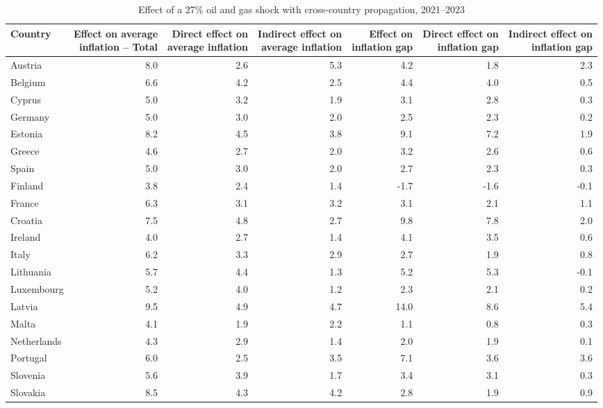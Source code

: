 \begin{table}[H]
\centering
\caption{Effect of a 27\% oil and gas shock with cross-country propagation, 2021--2023}
\label{tab:shock-oil-gas-chain-ea20}
\scriptsize
\setlength{\tabcolsep}{1.2pt}
\begin{tabular}{lrrrrrr}
\toprule
Country & \shortstack{Effect on average\\inflation -- Total} & \shortstack{Direct effect on\\average inflation} & \shortstack{Indirect effect on\\average inflation} & \shortstack{Effect on\\inflation gap} & \shortstack{Direct effect on\\inflation gap} & \shortstack{Indirect effect on\\inflation gap}
 \\
\midrule
Austria & 8.0 & 2.6 & 5.3 & 4.2 & 1.8 & 2.3
 \\
Belgium & 6.6 & 4.2 & 2.5 & 4.4 & 4.0 & 0.5
 \\
Cyprus & 5.0 & 3.2 & 1.9 & 3.1 & 2.8 & 0.3
 \\
Germany & 5.0 & 3.0 & 2.0 & 2.5 & 2.3 & 0.2
 \\
Estonia & 8.2 & 4.5 & 3.8 & 9.1 & 7.2 & 1.9
 \\
Greece & 4.6 & 2.7 & 2.0 & 3.2 & 2.6 & 0.6
 \\
Spain & 5.0 & 3.0 & 2.0 & 2.7 & 2.3 & 0.3
 \\
Finland & 3.8 & 2.4 & 1.4 & -1.7 & -1.6 & -0.1
 \\
France & 6.3 & 3.1 & 3.2 & 3.1 & 2.1 & 1.1
 \\
Croatia & 7.5 & 4.8 & 2.7 & 9.8 & 7.8 & 2.0
 \\
Ireland & 4.0 & 2.7 & 1.4 & 4.1 & 3.5 & 0.6
 \\
Italy & 6.2 & 3.3 & 2.9 & 2.7 & 1.9 & 0.8
 \\
Lithuania & 5.7 & 4.4 & 1.3 & 5.2 & 5.3 & -0.1
 \\
Luxembourg & 5.2 & 4.0 & 1.2 & 2.3 & 2.1 & 0.2
 \\
Latvia & 9.5 & 4.9 & 4.7 & 14.0 & 8.6 & 5.4
 \\
Malta & 4.1 & 1.9 & 2.2 & 1.1 & 0.8 & 0.3
 \\
Netherlands & 4.3 & 2.9 & 1.4 & 2.0 & 1.9 & 0.1
 \\
Portugal & 6.0 & 2.5 & 3.5 & 7.1 & 3.6 & 3.6
 \\
Slovenia & 5.6 & 3.9 & 1.7 & 3.4 & 3.1 & 0.3
 \\
Slovakia & 8.5 & 4.3 & 4.2 & 2.8 & 1.9 & 0.9

\end{tabular}
\end{table}
